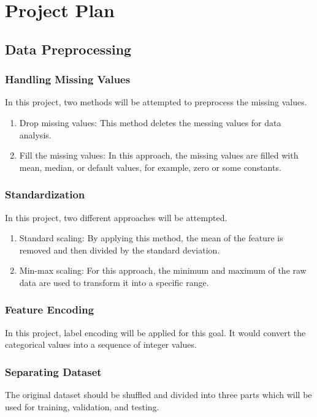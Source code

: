 \documentclass[12pt,twoside]{report}
\begin{document}
\chapter{Project Plan}

\section{Data Preprocessing}
\subsection{Handling Missing Values}
In this project, two methods will be attempted to preprocess the missing values.
\begin{enumerate}
	\item Drop missing values: This method deletes the messing values for data analysis.
	\item Fill the missing values: In this approach, the missing values are filled with mean, median, or default values, for example, zero or some constants.
\end{enumerate}

\subsection{Standardization}
In this project, two different approaches will be attempted. 
\begin{enumerate}
	\item Standard scaling: By applying this method, the mean of the feature is removed and then divided by the standard deviation. 
	\item Min-max scaling: For this approach, the minimum and maximum of the raw data are used to transform it into a specific range.
\end{enumerate}

\subsection{Feature Encoding}
In this project, label encoding will be applied for this goal. It would convert the categorical values into a sequence of integer values. 

\subsection{Separating Dataset}
The original dataset should be shuffled and divided into three parts which will be used for training, validation, and testing. 
\end{document}
